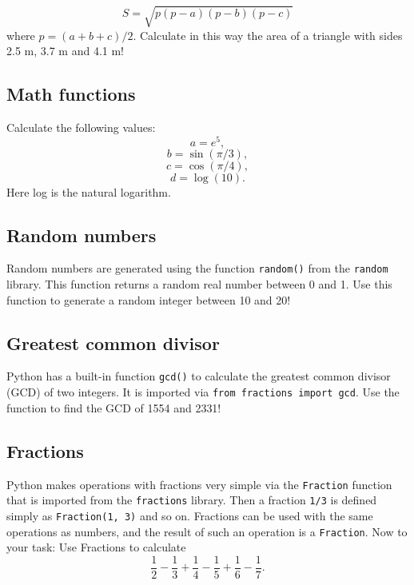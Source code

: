$$
S = \sqrt{p(p-a)(p-b)(p-c)}
$$
where $p = (a + b + c)/2$. Calculate in this way the area of a triangle with sides 
2.5 m, 3.7 m and 4.1 m!


\subsection{Math functions}

Calculate the following values:
$$
a = e^5,
$$
$$
b = \sin(\pi/3),
$$
$$
c = \cos(\pi/4),
$$
$$
d = \log(10).
$$
Here log is the natural logarithm.


\subsection{Random numbers}

Random numbers are generated using the function {\tt random()} from the {\tt random}
library. This function returns a random real number between 0 and 1. 
Use this function to generate a random integer between 
10 and 20!


\subsection{Greatest common divisor}

Python has a built-in function {\tt gcd()} to calculate the greatest common divisor (GCD)
of two integers. It is imported via {\tt from fractions import gcd}. Use 
the function to find the GCD of 1554 and 2331!


\subsection{Fractions}

Python makes operations with fractions very simple via the {\tt Fraction}
function that is imported from the {\tt fractions} library. Then 
a fraction {\tt 1/3} is defined simply as {\tt Fraction(1, 3)} and so on. Fractions
can be used with the same operations as numbers, and the result of such 
an operation is a {\tt Fraction}. Now to your task: Use Fractions to 
calculate
$$
\frac{1}{2} - \frac{1}{3} + \frac{1}{4} - \frac{1}{5} + \frac{1}{6} - \frac{1}{7}.
$$

